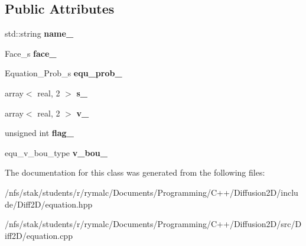 \subsection*{Public Attributes}
\begin{DoxyCompactItemize}
\item 
\hypertarget{classEquation_a2bbb65c98ebf1345231370e93b504037}{std\+::string {\bfseries name\+\_\+}}\label{classEquation_a2bbb65c98ebf1345231370e93b504037}

\item 
\hypertarget{classEquation_a9eeeceed0d8130fd30fb2e65f3b15f3f}{Face\+\_\+s {\bfseries face\+\_\+}}\label{classEquation_a9eeeceed0d8130fd30fb2e65f3b15f3f}

\item 
\hypertarget{classEquation_a1ece93bf1c58eb22001327da69ab73fc}{Equation\+\_\+\+Prob\+\_\+s {\bfseries equ\+\_\+prob\+\_\+}}\label{classEquation_a1ece93bf1c58eb22001327da69ab73fc}

\item 
\hypertarget{classEquation_ac7f793f3b1e3694b719d91d884460880}{array$<$ real, 2 $>$ {\bfseries s\+\_\+}}\label{classEquation_ac7f793f3b1e3694b719d91d884460880}

\item 
\hypertarget{classEquation_aa48c28c116aec278f7713a414dec6196}{array$<$ real, 2 $>$ {\bfseries v\+\_\+}}\label{classEquation_aa48c28c116aec278f7713a414dec6196}

\item 
\hypertarget{classEquation_a1820f1ab792e83981456fce5dda492b9}{unsigned int {\bfseries flag\+\_\+}}\label{classEquation_a1820f1ab792e83981456fce5dda492b9}

\item 
\hypertarget{classEquation_a7e567297fdc05d136f1dc5e10867c224}{equ\+\_\+v\+\_\+bou\+\_\+type {\bfseries v\+\_\+bou\+\_\+}}\label{classEquation_a7e567297fdc05d136f1dc5e10867c224}

\end{DoxyCompactItemize}


The documentation for this class was generated from the following files\+:\begin{DoxyCompactItemize}
\item 
/nfs/stak/students/r/rymalc/\+Documents/\+Programming/\+C++/\+Diffusion2\+D/include/\+Diff2\+D/equation.\+hpp\item 
/nfs/stak/students/r/rymalc/\+Documents/\+Programming/\+C++/\+Diffusion2\+D/src/\+Diff2\+D/equation.\+cpp\end{DoxyCompactItemize}
